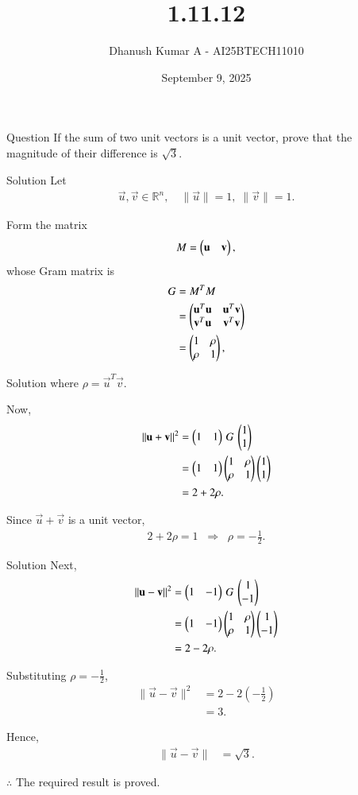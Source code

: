 \documentclass{beamer}
\title 
{1.11.12}
\date{September 9, 2025}
\author 
{Dhanush Kumar A - AI25BTECH11010}
\begin{document}
\frame{\titlepage}
\begin{frame}{Question}
If the sum of two unit vectors is a unit vector, prove that the magnitude of their difference is \(\sqrt{3}\).
\end{frame}
\begin{frame}{Solution}
Let
\begin{align}
\vec{u}, \vec{v} \in \mathbb{R}^n, \quad
\|\vec{u}\|=1,\;\|\vec{v}\|=1.
\end{align}

Form the matrix
\begin{align}
M = \begin{pmatrix}\mathbf{u} & \mathbf{v}\end{pmatrix},
\end{align}
whose Gram matrix is
\begin{align}
G &= M^TM \\
  &= \begin{pmatrix} \mathbf{u}^T\mathbf{u} & \mathbf{u}^T\mathbf{v} \\ \mathbf{v}^T\mathbf{u} & \mathbf{v}^T\mathbf{v} \end{pmatrix} \\
  &= \begin{pmatrix}1 & \rho \\ \rho & 1\end{pmatrix},
\end{align}
\end{frame}
\begin{frame}{Solution}
where \(\rho = \vec{u}^T\vec{v}\).

Now,
\begin{align}
\|\mathbf{u}+\mathbf{v}\|^2 
&= \begin{pmatrix}1 & 1\end{pmatrix} \, G \, \begin{pmatrix}1 \\ 1\end{pmatrix} \\
&= \begin{pmatrix}1 & 1\end{pmatrix}\begin{pmatrix}1 & \rho \\ \rho & 1\end{pmatrix}\begin{pmatrix}1 \\ 1\end{pmatrix} \\
&= 2 + 2\rho.
\end{align}

Since \(\vec{u}+\vec{v}\) is a unit vector,
\begin{align}
2 + 2\rho = 1 \;\;\Rightarrow\;\; \rho = -\tfrac{1}{2}.
\end{align}
\end{frame}
\begin{frame}{Solution}
Next,
\begin{align}
\|\mathbf{u}-\mathbf{v}\|^2 
&= \begin{pmatrix}1 & -1\end{pmatrix} \, G \, \begin{pmatrix}1 \\ -1\end{pmatrix} \\
&= \begin{pmatrix}1 & -1\end{pmatrix}\begin{pmatrix}1 & \rho \\ \rho & 1\end{pmatrix}\begin{pmatrix}1 \\ -1\end{pmatrix} \\
&= 2 - 2\rho.
\end{align}

Substituting \(\rho = -\tfrac{1}{2}\),
\begin{align}
\|\vec{u}-\vec{v}\|^2 &= 2 - 2\left(-\tfrac{1}{2}\right) \\
&= 3.
\end{align}

Hence,
\begin{align}
\|\vec{u}-\vec{v}\| &= \sqrt{3}.
\end{align}

\noindent\(\therefore\) The required result is proved.
\end{frame}
\end{document}
